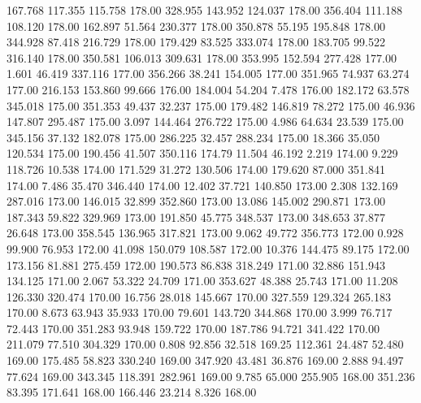  167.768  117.355  115.758       178.00
 328.955  143.952  124.037       178.00
 356.404  111.188  108.120       178.00
 162.897   51.564  230.377       178.00
 350.878   55.195  195.848       178.00
 344.928   87.418  216.729       178.00
 179.429   83.525  333.074       178.00
 183.705   99.522  316.140       178.00
 350.581  106.013  309.631       178.00
 353.995  152.594  277.428       177.00
   1.601   46.419  337.116       177.00
 356.266   38.241  154.005       177.00
 351.965   74.937   63.274       177.00
 216.153  153.860   99.666       176.00
 184.004   54.204    7.478       176.00
 182.172   63.578  345.018       175.00
 351.353   49.437   32.237       175.00
 179.482  146.819   78.272       175.00
  46.936  147.807  295.487       175.00
   3.097  144.464  276.722       175.00
   4.986   64.634   23.539       175.00
 345.156   37.132  182.078       175.00
 286.225   32.457  288.234       175.00
  18.366   35.050  120.534       175.00
 190.456   41.507  350.116       174.79
  11.504   46.192    2.219       174.00
   9.229  118.726   10.538       174.00
 171.529   31.272  130.506       174.00
 179.620   87.000  351.841       174.00
   7.486   35.470  346.440       174.00
  12.402   37.721  140.850       173.00
   2.308  132.169  287.016       173.00
 146.015   32.899  352.860       173.00
  13.086  145.002  290.871       173.00
 187.343   59.822  329.969       173.00
 191.850   45.775  348.537       173.00
 348.653   37.877   26.648       173.00
 358.545  136.965  317.821       173.00
   9.062   49.772  356.773       172.00
   0.928   99.900   76.953       172.00
  41.098  150.079  108.587       172.00
  10.376  144.475   89.175       172.00
 173.156   81.881  275.459       172.00
 190.573   86.838  318.249       171.00
  32.886  151.943  134.125       171.00
   2.067   53.322   24.709       171.00
 353.627   48.388   25.743       171.00
  11.208  126.330  320.474       170.00
  16.756   28.018  145.667       170.00
 327.559  129.324  265.183       170.00
   8.673   63.943   35.933       170.00
  79.601  143.720  344.868       170.00
   3.999   76.717   72.443       170.00
 351.283   93.948  159.722       170.00
 187.786   94.721  341.422       170.00
 211.079   77.510  304.329       170.00
   0.808   92.856   32.518       169.25
 112.361   24.487   52.480       169.00
 175.485   58.823  330.240       169.00
 347.920   43.481   36.876       169.00
   2.888   94.497   77.624       169.00
 343.345  118.391  282.961       169.00
   9.785   65.000  255.905       168.00
 351.236   83.395  171.641       168.00
 166.446   23.214    8.326       168.00
